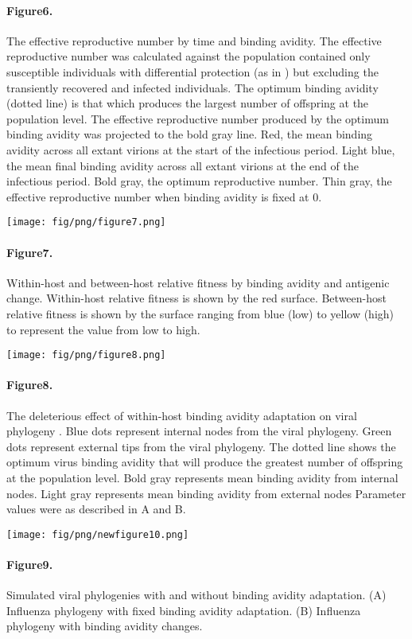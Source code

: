 \documentclass[12pt,a4paper]{article}
\begin{document}
\paragraph*{Figure6.}
\label{Fig6}
The effective reproductive number by time and binding avidity. The effective reproductive number was calculated against the population contained only susceptible individuals with differential protection (as in ) but excluding the transiently recovered and infected individuals. The optimum binding avidity (dotted line) is that which produces the largest number of offspring at the population level. The effective reproductive number produced by the optimum binding avidity was projected to the bold gray line. Red, the mean binding avidity across all extant virions at the start of the infectious period. Light blue, the mean final binding avidity across all extant virions at the end of the infectious period. Bold gray, the optimum reproductive number. Thin gray, the effective reproductive number when binding avidity is fixed at 0.
\clearpage

\texttt{[image: fig/png/figure7.png]}
\paragraph*{Figure7.}
\label{Fig7}
Within-host and between-host relative fitness by binding avidity and antigenic change. Within-host relative fitness is shown by the red surface. Between-host relative fitness is shown by the  surface ranging from blue (low) to yellow (high) to represent the value from low to high.
\clearpage

\texttt{[image: fig/png/figure8.png]}
\paragraph*{Figure8.}
\label{Fig8}
The deleterious effect of within-host binding avidity adaptation on viral phylogeny . Blue dots represent internal nodes from the viral phylogeny. Green dots represent external tips from the viral phylogeny. The dotted line shows the optimum virus binding avidity that will produce the greatest number of offspring at the population level. Bold gray represents mean binding avidity from internal nodes. Light gray represents mean binding avidity from external nodes Parameter values were as described in A and B.
\clearpage

\texttt{[image: fig/png/newfigure10.png]}
\paragraph*{Figure9.}
\label{Fig9}
Simulated viral phylogenies with and without binding avidity adaptation. (A) Influenza phylogeny with fixed binding avidity adaptation. (B) Influenza phylogeny with binding avidity changes.
\end{document}
